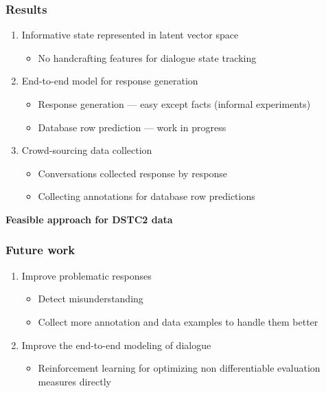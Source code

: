 \documentclass[10pt, compress,british,xcolor={svgnames,dvipsnames,x11names},trans]{beamer}
\begin{document}
\begin{frame}\frametitle{Results}
    \begin{enumerate}
        \item Informative state represented in latent vector space
        \begin{itemize}
            \item No handcrafting features for dialogue state tracking~\cite{platek_recurrent_2016}
        \end{itemize}
        \item End-to-end model for response generation
            \begin{itemize}
            \item Response generation --- easy except facts (informal experiments)
            \item Database row prediction --- work in progress
            \end{itemize}
        \item Crowd-sourcing data collection~\cite{platek2016wochat}
            \begin{itemize}
                \item Conversations collected response by response
                \item Collecting annotations for database row predictions
            \end{itemize}
    \end{enumerate}
    {\bf \color{darkgreen} Feasible approach for DSTC2 data}
\end{frame}

\begin{frame}\frametitle{Future work}
    \begin{enumerate}
        \item Improve problematic responses
            \begin{itemize}
                \item Detect misunderstanding
                \item Collect more annotation and data examples to handle them better
            \end{itemize}
        \item Improve the end-to-end modeling of dialogue
            \begin{itemize}
                \item Reinforcement learning for optimizing non differentiable evaluation measures directly
            \end{itemize}
    \end{enumerate}
\end{frame}
\end{document}
